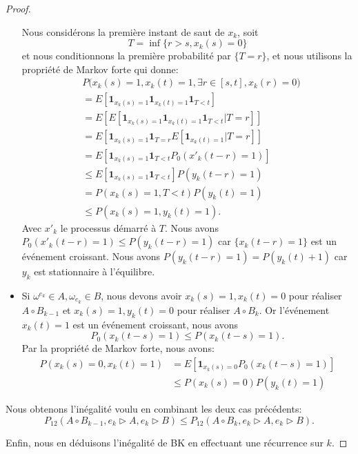 \documentclass[titlepage,a4paper,12pt]{article}
\newcounter{prop}
\begin{document}
\begin{proof}
\begin{itemize}[label = $\bullet$, leftmargin = *]
Nous considérons la première instant de saut de $x_k$, soit 
$$T = \inf\{ r> s, x_k(s) =0 \}
$$
et nous conditionnons la première probabilité par $\{T=r\}$, et nous utilisons la propriété de Markov forte qui donne:
\begin{align*}
&P\big(x_k(s) = 1, x_k(t) =1, \exists r\in [s,t], x_k(r) = 0\big) \\
&= E\left[\mathbf{1}_{x_k(s) = 1}\mathbf{1}_{x_k(t) = 1}\mathbf{1}_{T<t}\right] \\
&= E\left[E[\mathbf{1}_{x_k(s) = 1}\mathbf{1}_{x_k(t) = 1}\mathbf{1}_{T<t}| T=r]\right] \\
&= E\left[\mathbf{1}_{x_k(s) = 1}\mathbf{1}_{T = r}E[\mathbf{1}_{x_k(t) = 1}| T=r]\right] \\
& = E\left[\mathbf{1}_{x_k(s) = 1}\mathbf{1}_{T <t}P_0(x'_k(t-r) =1)\right] \\
& \leqslant E\left[\mathbf{1}_{x_k(s) = 1}\mathbf{1}_{T <t}\right]P(y_k(t-r) =1)\\
& = P(x_k(s) = 1, T< t) P(y_k(t)=1) \\
& \leqslant P(x_k(s)=1, y_k(t) = 1).
\end{align*}
Avec $x'_k$ le processus démarré à $T$. Nous avons $P_0(x'_k(t-r) = 1) \leqslant P(y_k(t-r) = 1)$ car $\{x_k(t-r) = 1\}$ est un événement croissant. Nous avons $P(y_k(t-r)= 1) = P(y_k(t)+1)$ car $y_k$ est stationnaire à l'équilibre.

\item Si $\omega^{e_k}\in A, \omega_{e_k}\in B$, nous devons avoir $x_k(s)=1,x_k(t)=0$ pour réaliser $A\circ B_{k-1}$ et $x_k(s) = 1, y_k(t) = 0$ pour réaliser $A\circ B_k$. Or l'événement $x_k(t) = 1$ est un événement croissant, nous avons $$P_0(x_k(t-s) = 1)\leqslant P(x_k(t-s) =1).$$ Par la propriété de Markov forte, nous avons:
\begin{align*}
P(x_k(s) = 0, x_k(t) = 1) &= E[\mathbf{1}_{x_k(s)=0}P_0(x_k(t-s) = 1)]\\
& \leqslant P(x_k(s) = 0) P(y_k(t) = 1)
\end{align*}
\end{itemize}


Nous obtenons l'inégalité voulu en combinant les deux cas précédents: $$P_{12}(A\circ B_{k-1}, e_k\triangleright A, e_k \triangleright B)\leqslant P_{12}(A\circ B_{k}, e_k\triangleright A, e_k \triangleright B).$$

Enfin, nous en déduisons l'inégalité de BK en effectuant une récurrence sur $k$. 
\end{proof}
\end{document}
